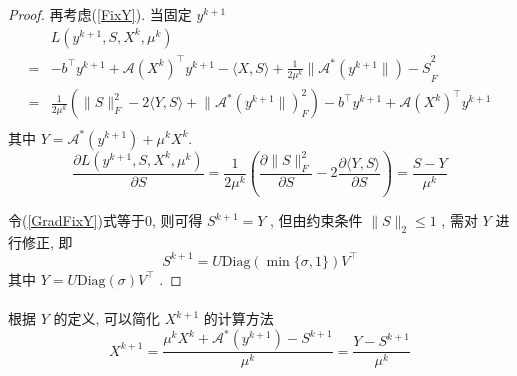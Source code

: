 \documentclass[a4paper, UTF8]{ctexart}
\numberwithin{equation}{section}  %
\begin{document}
\begin{proof}
				\quad 再考虑(\ref{FixY}). 当固定 $y^{k + 1}$
				\begin{equation}
					\begin{split}\label{LagFixY}
							& L(y^{k + 1},S,X^k,\mu^k)\\
						=	& -b^\top y^{k + 1} + \mathcal{A}(X^k)^\top y^{k + 1} - \langle{X, S}\rangle + \frac{1}{2\mu^k} \lVert{\mathcal{A}^*(y^{k + 1}\rVert) - S}^2_F\\
						=	& \frac{1}{2\mu^k}(\lVert{S}\rVert_F^2 - 2\langle{Y, S}\rangle + \lVert{\mathcal{A}^*(y^{k + 1}\rVert)}_F^2) - b^\top y^{k + 1} + \mathcal{A}(X^k)^\top y^{k + 1}\\
					\end{split}
				\end{equation}
				其中 $Y = \mathcal{A}^*(y^{k + 1}) + \mu^k X^k$.
				\begin{equation}\label{GradFixY}
						\frac{\partial L(y^{k + 1},S,X^k,\mu^k)}{\partial S}
					=	\frac{1}{2\mu^k}(\frac{\partial \lVert{S}\rVert_F^2}{\partial S} - 2 \frac{\partial \langle{Y, S}\rangle}{\partial S})
					=	\frac{S - Y}{\mu^k}
				\end{equation}

				\quad 令(\ref{GradFixY})式等于0, 则可得 $S^{k + 1} = Y$ , 但由约束条件 $\lVert{S}\rVert_2 \leq 1$ , 需对 $Y$ 进行修正, 即
				\begin{equation}
					S^{k + 1} = U \text{Diag}(\min \{\sigma, 1\}) V^\top
				\end{equation}
				其中 $Y = U \text{Diag}(\sigma) V^\top$ .
			\end{proof}

			\paragraph{}
				\quad 根据 $Y$ 的定义, 可以简化 $X^{k + 1}$ 的计算方法
				\begin{equation}\label{dualAX}
						X^{k + 1}
					=	\frac{\mu^kX^k + \mathcal{A}^*(y^{k + 1})-S^{k + 1}}{\mu^k}
					=	\frac{Y - S^{k + 1}}{\mu^k}
				\end{equation}
\end{document}
